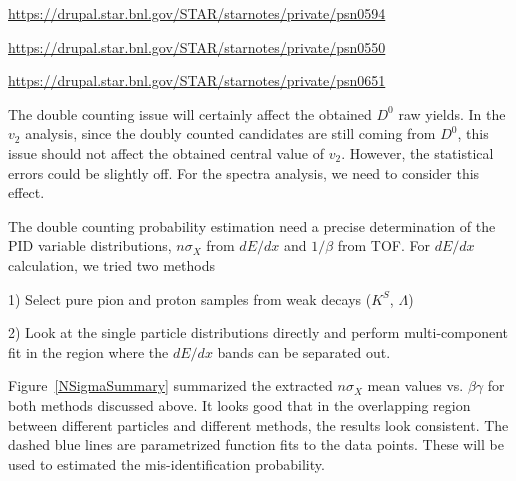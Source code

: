 \url{https://drupal.star.bnl.gov/STAR/starnotes/private/psn0594}

\url{https://drupal.star.bnl.gov/STAR/starnotes/private/psn0550}

\url{https://drupal.star.bnl.gov/STAR/starnotes/private/psn0651}

The double counting issue will certainly affect the obtained $D^0$ raw yields. In the $v_2$ analysis, since the doubly counted candidates are still coming from $D^0$, this issue should not affect the obtained central value of $v_2$. However, the statistical errors could be slightly off. For the spectra analysis, we need to consider this effect.

The double counting probability estimation need a precise determination of the PID variable distributions, $n\sigma_X$ from $dE/dx$ and $1/\beta$ from TOF. For $dE/dx$ calculation, we tried two methods

1) Select pure pion and proton samples from weak decays ($K^{S}$, $\Lambda$)

2) Look at the single particle distributions directly and perform multi-component fit in the region where the $dE/dx$ bands can be separated out.

Figure~\ref{NSigmaSummary} summarized the extracted $n\sigma_{X}$ mean values vs. $\beta\gamma$ for both methods discussed above. It looks good that in the overlapping region between different particles and different methods, the results look consistent. The dashed blue lines are parametrized function fits to the data points. These will be used to estimated the mis-identification probability.

\begin{figure}
\end{figure}

